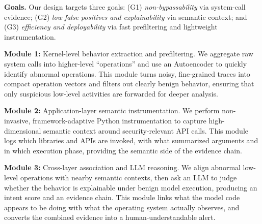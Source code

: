 \noindent \textbf{Goals.} Our design targets three goals: (G1) \emph{non-bypassability} via system-call evidence; (G2) \emph{low false positives and explainability} via semantic context; and (G3) \emph{efficiency and deployability} via fast prefiltering and lightweight instrumentation.


\noindent \textbf{Module 1: } Kernel-level behavior extraction and prefiltering. We aggregate raw system calls into higher-level ``operations'' and use an Autoencoder to quickly identify abnormal operations. This module turns noisy, fine-grained traces into compact operation vectors and filters out clearly benign behavior, ensuring that only suspicious low-level activities are forwarded for deeper analysis.

\noindent \textbf{Module 2:} Application-layer semantic instrumentation. We perform non-invasive, framework-adaptive Python instrumentation to capture high-dimensional semantic context around security-relevant API calls. This module logs which libraries and APIs are invoked, with what summarized arguments and in which execution phase, providing the semantic side of the evidence chain.

\noindent \textbf{Module 3: } Cross-layer association and LLM reasoning. We align abnormal low-level operations with nearby semantic contexts, then ask an LLM to judge whether the behavior is explainable under benign model execution, producing an intent score and an evidence chain. This module links what the model code appears to be doing with what the operating system actually observes, and converts the combined evidence into a human-understandable alert.

